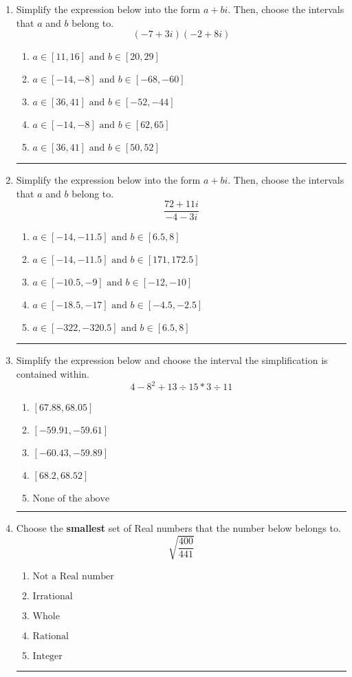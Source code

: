\documentclass[14pt]{extbook}
\newcommand{\litem}[1]{\item#1\hspace*{-1cm}\rule{\textwidth}{0.4pt}}
\begin{document}
\begin{enumerate}
{\begin{enumerate}[label=\Alph*.]
\end{enumerate} }
\litem{
Simplify the expression below into the form $a+bi$. Then, choose the intervals that $a$ and $b$ belong to.\[ (-7 + 3 i)(-2 + 8 i) \]\begin{enumerate}[label=\Alph*.]
\item \( a \in [11, 16] \text{ and } b \in [20, 29] \)
\item \( a \in [-14, -8] \text{ and } b \in [-68, -60] \)
\item \( a \in [36, 41] \text{ and } b \in [-52, -44] \)
\item \( a \in [-14, -8] \text{ and } b \in [62, 65] \)
\item \( a \in [36, 41] \text{ and } b \in [50, 52] \)

\end{enumerate} }
\litem{
Simplify the expression below into the form $a+bi$. Then, choose the intervals that $a$ and $b$ belong to.\[ \frac{72 + 11 i}{-4 - 3 i} \]\begin{enumerate}[label=\Alph*.]
\item \( a \in [-14, -11.5] \text{ and } b \in [6.5, 8] \)
\item \( a \in [-14, -11.5] \text{ and } b \in [171, 172.5] \)
\item \( a \in [-10.5, -9] \text{ and } b \in [-12, -10] \)
\item \( a \in [-18.5, -17] \text{ and } b \in [-4.5, -2.5] \)
\item \( a \in [-322, -320.5] \text{ and } b \in [6.5, 8] \)

\end{enumerate} }
\litem{
Simplify the expression below and choose the interval the simplification is contained within.\[ 4 - 8^2 + 13 \div 15 * 3 \div 11 \]\begin{enumerate}[label=\Alph*.]
\item \( [67.88, 68.05] \)
\item \( [-59.91, -59.61] \)
\item \( [-60.43, -59.89] \)
\item \( [68.2, 68.52] \)
\item \( \text{None of the above} \)

\end{enumerate} }
\litem{
Choose the \textbf{smallest} set of Real numbers that the number below belongs to.\[ \sqrt{\frac{400}{441}} \]\begin{enumerate}[label=\Alph*.]
\item \( \text{Not a Real number} \)
\item \( \text{Irrational} \)
\item \( \text{Whole} \)
\item \( \text{Rational} \)
\item \( \text{Integer} \)


\end{enumerate}}
\end{enumerate}
\end{document}
